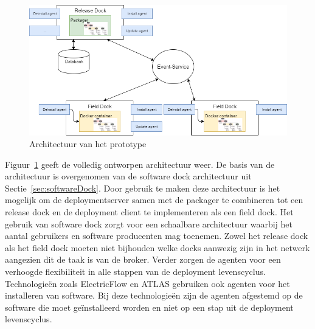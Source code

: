 \begin{figure}
\includegraphics[width=\textwidth,height=\textheight,keepaspectratio]{afbeelding/architectuur.png}
\centering
\caption{Architectuur van het prototype}
\label{fig:architectuur}
\end{figure}

Figuur~\ref{fig:architectuur} geeft de volledig ontworpen architectuur weer.
De basis van de architectuur is overgenomen van de software dock architectuur uit Sectie~\ref{sec:softwareDock}.
Door gebruik te maken deze architectuur is het mogelijk om de deploymentserver samen met de packager te combineren tot een release dock en de deployment client te implementeren als een field dock. 
Het gebruik van software dock zorgt voor een schaalbare architectuur waarbij het aantal gebruikers en software producenten mag toenemen.
Zowel het release dock als het field dock moeten niet bijhouden welke docks aanwezig zijn in het netwerk aangezien dit de taak is van de broker.
Verder zorgen de agenten voor een verhoogde flexibiliteit in alle stappen van de deployment levenscyclus.
Technologieën zoals ElectricFlow en ATLAS gebruiken ook agenten voor het installeren van software.
Bij deze technologieën zijn de agenten afgestemd op de software die moet geïnstalleerd worden en niet op een stap uit de deployment levenscyclus.

